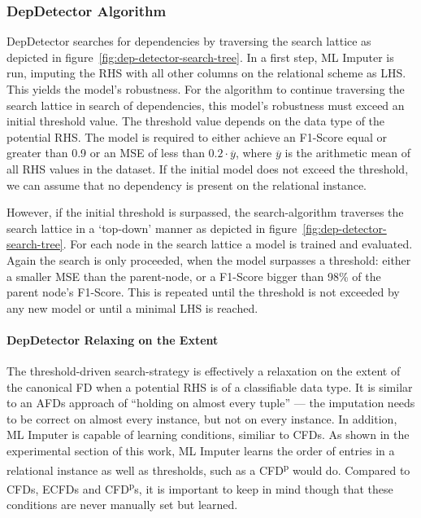 \subsubsection{DepDetector Algorithm}
DepDetector searches for dependencies by traversing the search lattice as depicted in figure~\ref{fig:dep-detector-search-tree}.
In a first step, ML Imputer is run, imputing the RHS with all other columns on the relational scheme as LHS.
This yields the model's robustness.
For the algorithm to continue traversing the search lattice in search of dependencies, this model's robustness must exceed an initial threshold value.
The threshold value depends on the data type of the potential RHS.
The model is required to either achieve an F1-Score equal or greater than 0.9 or an MSE of less than \( 0.2 \cdot \overline{y} \), where \( \overline{y} \) is the arithmetic mean of all RHS values in the dataset.
If the initial model does not exceed the threshold, we can assume that no dependency is present on the relational instance.

However, if the initial threshold is surpassed, the search-algorithm traverses the search lattice in a `top-down' manner as depicted in figure~\ref{fig:dep-detector-search-tree}.
For each node in the search lattice a model is trained and evaluated.
Again the search is only proceeded, when the model surpasses a threshold: either a smaller MSE than the parent-node, or a F1-Score bigger than 98\% of the parent node's F1-Score.
This is repeated until the threshold is not exceeded by any new model or until a minimal LHS is reached.

\paragraph{DepDetector Relaxing on the Extent}The threshold-driven search-strategy is effectively a relaxation on the extent of the canonical FD when a potential RHS is of a classifiable data type.
It is similar to an AFDs approach of ``holding on almost every tuple'' --- the imputation needs to be correct on almost every instance, but not on every instance.
In addition, ML Imputer is capable of learning conditions, similiar to CFDs.
As shown in the experimental section of this work, ML Imputer learns the order of entries in a relational instance as well as thresholds, such as a CFD\textsuperscript{p} would do.
Compared to CFDs, ECFDs and CFD\textsuperscript{p}s, it is important to keep in mind though that these conditions are never manually set but learned.

